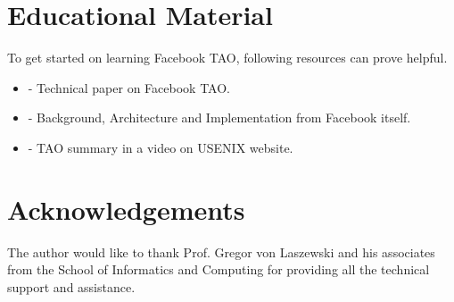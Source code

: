 \documentclass[9pt,twocolumn,twoside]{../../styles/osajnl}
\begin{document}
\section{Educational Material}

To get started on learning Facebook TAO, following resources can prove helpful.

\begin{itemize}
\item \cite{book-tao1} - Technical paper on Facebook TAO.

\item \cite{www-tao2} - Background, Architecture and Implementation from Facebook itself.

\item \cite{www-tao3} - TAO summary in a video on USENIX website.

\end{itemize}

\section {Acknowledgements}
The author would like to thank Prof. Gregor von Laszewski and his associates from the School of Informatics and Computing for providing all the technical support and assistance.



\end{document}
